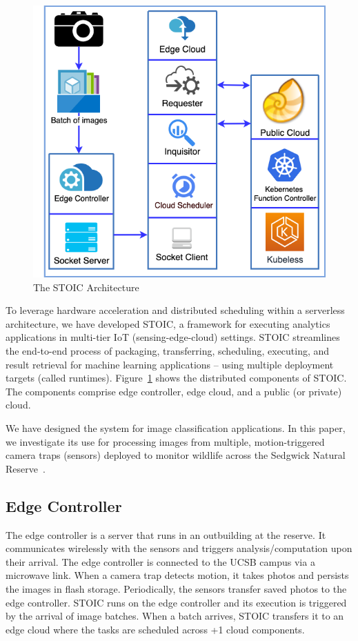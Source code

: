 \begin{figure}
    \centering
    \includegraphics[scale=0.4]{figures/STOIC.png}
    \caption{The STOIC Architecture \label{fig:STOIC}}
\end{figure}


To leverage hardware acceleration and distributed scheduling within a serverless architecture, we have developed STOIC, a framework for executing analytics applications in multi-tier IoT (sensing-edge-cloud) settings. STOIC streamlines the end-to-end process of packaging, transferring, scheduling, executing, and result retrieval for machine learning applications -- using multiple deployment targets (called runtimes). Figure~\ref{fig:STOIC} shows the distributed components of STOIC. The components comprise edge controller, edge cloud, and a public (or private) cloud.

We have designed the system for image classification applications. In this paper, we investigate its use for processing images from multiple, motion-triggered camera traps (sensors) deployed to monitor wildlife across the Sedgwick Natural Reserve~\cite{ref:sedgwick}.

\subsection{Edge Controller}
The edge controller is a server that runs in an outbuilding at the reserve. It communicates wirelessly with the sensors and triggers analysis/computation upon their arrival. The edge controller is connected to the UCSB campus via a microwave link. When a camera trap detects motion, it takes photos and persists the images in flash storage. Periodically, the sensors transfer saved photos to the edge controller. STOIC runs on the edge controller and its execution is triggered by the arrival of image batches. When a batch arrives, STOIC transfers it to an edge cloud where the tasks are scheduled across +1 cloud components.
 
